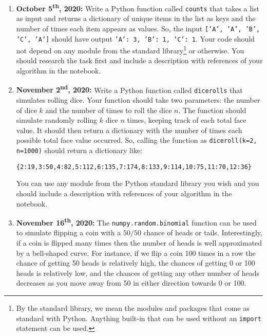 \documentclass[a4paper, 12pt]{scrartcl}
\begin{document}
    \begin{enumerate}
      \item \textbf{October 5\textsuperscript{th}, 2020:}
        Write a Python function called \texttt{counts} that takes a list as input and returns a dictionary of unique items in the list as keys and the number of times each item appears as values.
        So, the input \texttt{['A', 'A', 'B', 'C', 'A']} should have output \texttt{{'A': 3, 'B': 1, 'C': 1}}.
        Your code should not depend on any module from the standard library\footnote{By the standard library, we mean the modules and packages that come as standard with Python. Anything built-in that can be used without an \texttt{import} statement can be used.} or otherwise.
        You should research the task first and include a description with references of your algorithm in the notebook.
      \item \textbf{November 2\textsuperscript{nd}, 2020:}
        Write a Python function called \texttt{dicerolls} that simulates rolling dice.
        Your function should take two parameters: the number of dice $k$ and the number of times to roll the dice $n$.
        The function should simulate randomly rolling $k$ dice $n$ times, keeping track of each total face value.
        It should then return a dictionary with the number of times each possible total face value occurred.
        So, calling the function as \texttt{diceroll(k=2, n=1000)} should return a dictionary like:
        \begin{verbatim}
{2:19,3:50,4:82,5:112,6:135,7:174,8:133,9:114,10:75,11:70,12:36}
        \end{verbatim}
        You can use any module from the Python standard library you wish and you should include a description with references of your algorithm in the notebook.
        \newpage
      \item \textbf{November 16\textsuperscript{th}, 2020:}
        The \texttt{numpy.random.binomial} function can be used to simulate flipping a coin with a $50/50$ chance of heads or tails.
        Interestingly, if a coin is flipped many times then the number of heads is well approximated by a bell-shaped curve.
        For instance, if we flip a coin 100 times in a row the chance of getting 50 heads is relatively high, the chances of getting 0 or 100 heads is relatively low, and the chances of getting any other number of heads decreases as you move away from 50 in either direction towards 0 or 100.

\end{enumerate}
\end{document}
